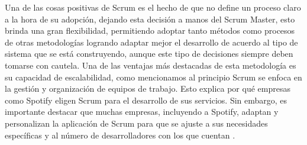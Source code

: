 \documentclass[a4paper,10pt]{article}
\begin{document}
	Una de las cosas positivas de Scrum es el hecho de que no define un proceso claro a la hora de su adopción, dejando esta decisión a manos del Scrum Master, esto brinda una gran flexibilidad, permitiendo adoptar tanto métodos como procesos de otras metodologías logrando adaptar mejor el desarrollo de acuerdo al tipo de sistema que se está construyendo, aunque este tipo de decisiones siempre deben tomarse con cautela. Una de las ventajas más destacadas de esta metodología es su capacidad de escalabilidad, como mencionamos al principio Scrum se enfoca en la gestión y organización de equipos de trabajo. Esto explica por qué empresas como Spotify eligen Scrum para el desarrollo de sus servicios. Sin embargo, es importante destacar que muchas empresas, incluyendo a Spotify, adaptan y personalizan la aplicación de Scrum para que se ajuste a sus necesidades específicas y al número de desarrolladores con los que cuentan \parencite{kniberg2012scaling}.
\end{document}
